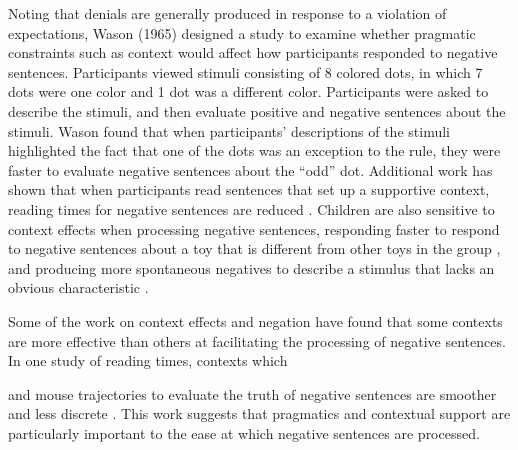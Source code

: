 \documentclass[10pt,letterpaper]{article}
\begin{document}
Noting that denials are generally produced in response to a violation of expectations, Wason (1965) designed a study to examine whether pragmatic constraints such as context would affect how participants responded to negative sentences.  Participants viewed stimuli consisting of 8 colored dots, in which 7 dots were one color and 1 dot was a different color.  Participants were asked to describe the stimuli, and then evaluate positive and negative sentences about the stimuli.  Wason found that when participants' descriptions of the stimuli highlighted the fact that one of the dots was an exception to the rule, they were faster to evaluate negative sentences about the ``odd'' dot.  Additional work has shown that when participants read sentences that set up a supportive context, reading times for negative sentences are reduced \cite{glenberg1999}.  Children are also sensitive to context effects when processing negative sentences, responding faster to respond to negative sentences about a toy that is different from other toys in the group \cite{devilliers1975}, and producing more spontaneous negatives to describe a stimulus that lacks an obvious characteristic \cite{watson1979}.  

Some of the work on context effects and negation have found that some contexts are more effective than others at facilitating the processing of negative sentences.  In one study of reading times, contexts which 

and mouse trajectories to evaluate the truth of negative sentences are smoother and less discrete \cite{dale2011}.  This work suggests that pragmatics and contextual support are particularly important to the ease at which negative sentences are processed.   
\end{document}
